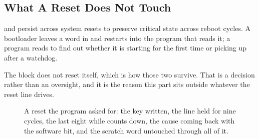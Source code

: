 \subsection{What A Reset Does Not Touch}

 and  persist across system resets to
preserve critical state across reboot cycles. A bootloader leaves a
word in  and restarts into the program that reads it; a
program reads  to find out whether it is starting for the
first time or picking up after a watchdog.

The block does not reset itself, which is how those two survive. That
is a decision rather than an oversight, and it is the reason this part
sits outside whatever the reset line drives.

\begin{figure}[htbp]
\centering

\caption{A reset the program asked for: the key written, the line
held for nine cycles, the last eight while  counts down,
the cause coming back with the software bit, and the scratch word
untouched through
all of it.}
\label{fig:x-syscon}
\end{figure}




